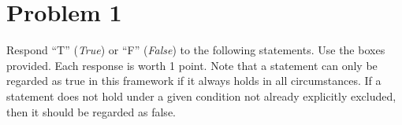 \documentclass[12pt,twoside]{article}
\newcommand{\?}{\stackrel{?}{=}}
\begin{document}







\section*{Problem 1 }
Respond ``T'' ({\it True})  or  ``F'' (\textit{False}) to the following statements.
Use the boxes provided. Each response is worth 1 point.
Note that a statement can only be regarded as true in this framework if it always holds in all circumstances.
If a statement does not hold under a given condition not already explicitly excluded, then it should be regarded as false.
\end{document}
